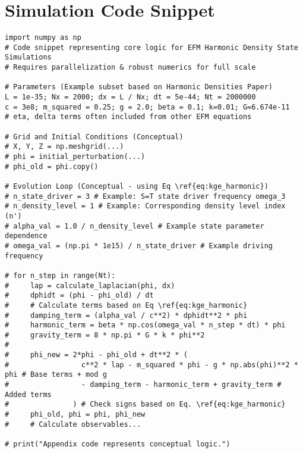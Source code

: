 \documentclass[11pt]{article}
\begin{document}
\appendix
\section{Simulation Code Snippet}
\begin{lstlisting}
import numpy as np
# Code snippet representing core logic for EFM Harmonic Density State Simulations
# Requires parallelization & robust numerics for full scale

# Parameters (Example subset based on Harmonic Densities Paper)
L = 1e-35; Nx = 2000; dx = L / Nx; dt = 5e-44; Nt = 2000000
c = 3e8; m_squared = 0.25; g = 2.0; beta = 0.1; k=0.01; G=6.674e-11
# eta, delta terms often included from other EFM equations

# Grid and Initial Conditions (Conceptual)
# X, Y, Z = np.meshgrid(...)
# phi = initial_perturbation(...)
# phi_old = phi.copy()

# Evolution Loop (Conceptual - using Eq \ref{eq:kge_harmonic})
# n_state_driver = 3 # Example: S=T state driver frequency omega_3
# n_density_level = 1 # Example: Corresponding density level index (n')
# alpha_val = 1.0 / n_density_level # Example state parameter dependence
# omega_val = (np.pi * 1e15) / n_state_driver # Example driving frequency

# for n_step in range(Nt):
#     lap = calculate_laplacian(phi, dx)
#     dphidt = (phi - phi_old) / dt
#     # Calculate terms based on Eq \ref{eq:kge_harmonic}
#     damping_term = (alpha_val / c**2) * dphidt**2 * phi
#     harmonic_term = beta * np.cos(omega_val * n_step * dt) * phi
#     gravity_term = 8 * np.pi * G * k * phi**2
#
#     phi_new = 2*phi - phi_old + dt**2 * (
#                 c**2 * lap - m_squared * phi - g * np.abs(phi)**2 * phi # Base terms + mod g
#                 - damping_term - harmonic_term + gravity_term # Added terms
#               ) # Check signs based on Eq. \ref{eq:kge_harmonic}
#     phi_old, phi = phi, phi_new
#     # Calculate observables...

# print("Appendix code represents conceptual logic.")
\end{lstlisting}
\end{document}
